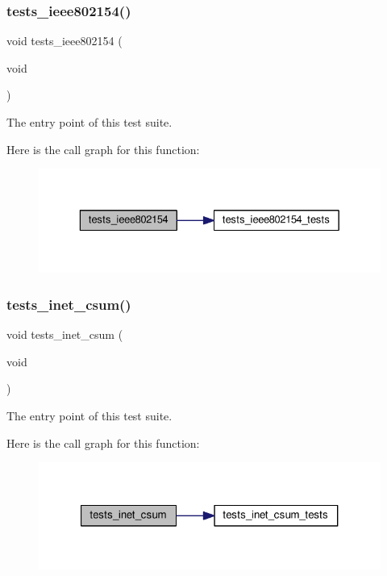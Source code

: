 \subsubsection{\texorpdfstring{tests\+\_\+ieee802154()}{tests\_ieee802154()}}
{\footnotesize\ttfamily void tests\+\_\+ieee802154 (\begin{DoxyParamCaption}\item[{void}]{ }\end{DoxyParamCaption})}



The entry point of this test suite. 

Here is the call graph for this function\+:
\nopagebreak
\begin{figure}[H]
\begin{center}
\leavevmode
\includegraphics[width=329pt]{group__unittests_ga610840bb2928eb0ca34a53f887a7e884_cgraph}
\end{center}
\end{figure}
\mbox{\label{group__unittests_gadfd01b88a3279960c0a209c588d7e733}} 
\subsubsection{\texorpdfstring{tests\+\_\+inet\+\_\+csum()}{tests\_inet\_csum()}}
{\footnotesize\ttfamily void tests\+\_\+inet\+\_\+csum (\begin{DoxyParamCaption}\item[{void}]{ }\end{DoxyParamCaption})}



The entry point of this test suite. 

Here is the call graph for this function\+:
\nopagebreak
\begin{figure}[H]
\begin{center}
\leavevmode
\includegraphics[width=321pt]{group__unittests_gadfd01b88a3279960c0a209c588d7e733_cgraph}
\end{center}
\end{figure}
\mbox{\label{group__unittests_ga629b2fe7a5d7d0f1623fbb0859868246}} 
